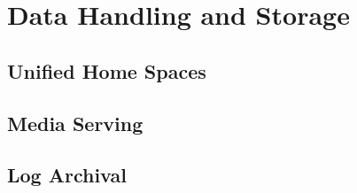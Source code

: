 \chapter{Data Handling and Storage}

\section{Unified Home Spaces}

\section{Media Serving}


\section{Log Archival}

